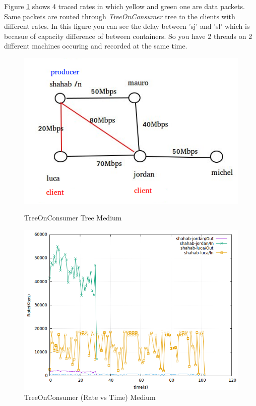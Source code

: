 Figure \ref{treeonconsumer} shows 4 traced rates in which yellow and green one are data packets. Same packets are routed through \textit{TreeOnConsumer} tree to the clients with different rates. In this figure you can see the delay between 'sj' and 'sl' which is becasue of capacity difference of between containers. So you have 2 threads on 2 different machines occuring and recorded at the same time.

\begin{figure}[H]

\begin{center}

\includegraphics[scale = 0.4]{Figures/TreeOnConsumer.png}

\caption{TreeOnConsumer Tree Medium} \label{TreeOnConsumer} 


\includegraphics[scale = 0.4]{Figures/treeonconsumer.png}

\caption{TreeOnConsumer (Rate vs Time) Medium} \label{treeonconsumer} 


\end{center}

\end{figure}


